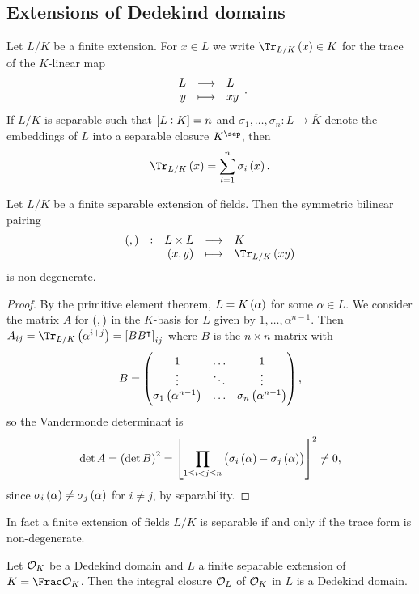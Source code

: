 \subsection{Extensions of Dedekind domains}

Let $ L / K $ be a finite extension. For $ x \in L $ we write $ \Tr_{L / K}\br{x} \in K $ for the trace of the $ K $-linear map
$$ \function{L}{L}{y}{xy}. $$
If $ L / K $ is separable such that $ \sbr{L : K} = n $ and $ \sigma_1, \dots, \sigma_n : L \to \overline{K} $ denote the embeddings of $ L $ into a separable closure $ K^{\sep} $, then
$$ \Tr_{L / K}\br{x} = \sum_{i = 1}^n \sigma_i\br{x}. $$

\pagebreak

\begin{lemma}
Let $ L / K $ be a finite separable extension of fields. Then the symmetric bilinear pairing
$$ \function[\br{,}]{L \times L}{K}{\br{x, y}}{\Tr_{L / K}\br{xy}} $$
is non-degenerate.
\end{lemma}

\begin{proof}
By the primitive element theorem, $ L = K\br{\alpha} $ for some $ \alpha \in L $. We consider the matrix $ A $ for $ \br{,} $ in the $ K $-basis for $ L $ given by $ 1, \dots, \alpha^{n - 1} $. Then $ A_{ij} = \Tr_{L / K}\br{\alpha^{i + j}} = \sbr{BB^\intercal}_{ij} $ where $ B $ is the $ n \times n $ matrix with
$$ B = \threebythree{1}{\dots}{1}{\vdots}{\ddots}{\vdots}{\sigma_1\br{\alpha^{n - 1}}}{\dots}{\sigma_n\br{\alpha^{n - 1}}}, $$
so the Vandermonde determinant is
$$ \det A = \br{\det B}^2 = \sbr{\prod_{1 \le i < j \le n} \br{\sigma_i\br{\alpha} - \sigma_j\br{\alpha}}}^2 \ne 0, $$
since $ \sigma_i\br{\alpha} \ne \sigma_j\br{\alpha} $ for $ i \ne j $, by separability.
\end{proof}

\begin{remark*}
In fact a finite extension of fields $ L / K $ is separable if and only if the trace form is non-degenerate.
\end{remark*}

\begin{theorem}
\label{thm:11.5}
Let $ \mathcal{O}_K $ be a Dedekind domain and $ L $ a finite separable extension of $ K = \Frac \OOO_K $. Then the integral closure $ \mathcal{O}_L $ of $ \mathcal{O}_K $ in $ L $ is a Dedekind domain.
\end{theorem}

